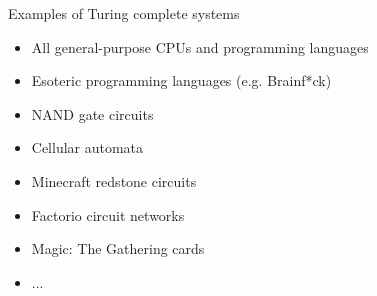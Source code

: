 \begin{frame}{Examples of Turing complete systems}
    \begin{itemize}
        \pause\item All general-purpose CPUs and programming languages
        \pause\item Esoteric programming languages (e.g. Brainf*ck)
        \pause\item NAND gate circuits
        \pause\item Cellular automata
        \pause\item Minecraft redstone circuits
        \pause\item Factorio circuit networks
        \pause\item Magic: The Gathering cards
        \pause\item ...
    \end{itemize}
\end{frame}

